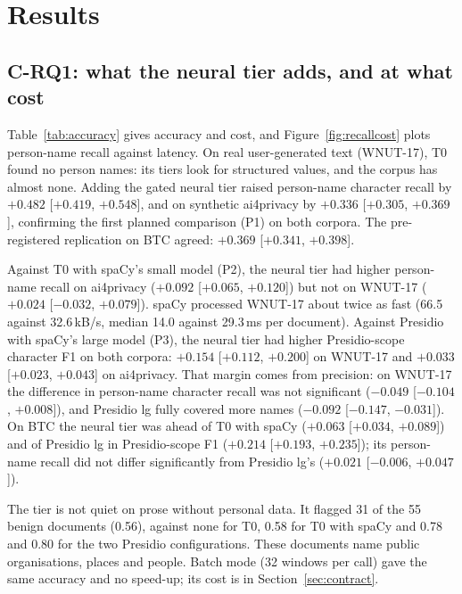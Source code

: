 \section{Results}\label{sec:results}



\subsection{C-RQ1: what the neural tier adds, and at what cost}\label{sec:nn}

Table~\ref{tab:accuracy} gives accuracy and cost, and Figure~\ref{fig:recallcost} plots person-name recall against latency. On real user-generated text (WNUT-17), T0 found no person names: its tiers look for structured values, and the corpus has almost none. Adding the gated neural tier raised person-name character recall by $+0.482$ [$+0.419$, $+0.548$], and on synthetic ai4privacy by $+0.336$ [$+0.305$, $+0.369$], confirming the first planned comparison (P1) on both corpora. The pre-registered replication on BTC agreed: $+0.369$ [$+0.341$, $+0.398$].

Against T0 with spaCy's small model (P2), the neural tier had higher person-name recall on ai4privacy ($+0.092$ [$+0.065$, $+0.120$]) but not on WNUT-17 ($+0.024$ [$-0.032$, $+0.079$]). spaCy processed WNUT-17 about twice as fast (66.5 against 32.6\,kB/s, median 14.0 against 29.3\,ms per document). Against Presidio with spaCy's large model (P3), the neural tier had higher Presidio-scope character F1 on both corpora: $+0.154$ [$+0.112$, $+0.200$] on WNUT-17 and $+0.033$ [$+0.023$, $+0.043$] on ai4privacy. That margin comes from precision: on WNUT-17 the difference in person-name character recall was not significant ($-0.049$ [$-0.104$, $+0.008$]), and Presidio lg fully covered more names ($-0.092$ [$-0.147$, $-0.031$]). On BTC the neural tier was ahead of T0 with spaCy ($+0.063$ [$+0.034$, $+0.089$]) and of Presidio lg in Presidio-scope F1 ($+0.214$ [$+0.193$, $+0.235$]); its person-name recall did not differ significantly from Presidio lg's ($+0.021$ [$-0.006$, $+0.047$]).

The tier is not quiet on prose without personal data. It flagged 31 of the 55 benign documents (0.56), against none for T0, 0.58 for T0 with spaCy and 0.78 and 0.80 for the two Presidio configurations. These documents name public organisations, places and people. Batch mode (32 windows per call) gave the same accuracy and no speed-up; its cost is in Section~\ref{sec:contract}.

